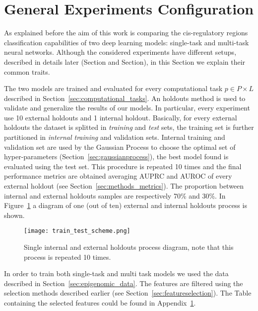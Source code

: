 \section{General Experiments Configuration}
As explained before the aim of this work is comparing the  cis-regulatory regions classification capabilities of two deep learning models: single-task and multi-task neural networks. Although the considered experiments have different setups, described in details later (Section and Section), in this Section we explain their common traits. 

The two models are trained and evaluated for every computational task $p \in P \times L$ described in Section~\ref{sec:computational_tasks}. 
An holdouts method is used to validate and generalize the results of our
models. In particular, every experiment use 10 external holdouts and 1 internal
holdout. Basically, for every external
holdouts the dataset is splitted in \emph{training} and \emph{test} sets, the
training set is further partitioned in \emph{internal training} and validation
sets. Internal training and validation set are used by the Gaussian Process to
choose the optimal set of hyper-parameters (Section~\ref{sec:gaussianprocess}),
the best model found is evaluated using the test set. This procedure is
repeated 10 times and the final performance metrics are obtained averaging AUPRC
and AUROC of every external holdout (see Section~\ref{sec:methods_metrics}). The proportion between internal and external holdouts samples are respectively 70\% and 30\%. In Figure~\ref{fig:train_test_diagram} a diagram of one (out of ten) external and internal holdouts process is shown. 
\begin{figure}[ht]
\centering
\texttt{[image: train\_test\_scheme.png]}
\caption{Single internal and external holdouts process diagram, note that this
process is repeated 10 times.} 
\label{fig:train_test_diagram}
\end{figure}
In order to train both single-task and multi task models we used the data described in Section~\ref{sec:epigenomic_data}. The features are filtered using the selection methods described earlier (see Section~\ref{sec:featureselection}). The Table containing the selected features could be found in Appendix~\ref{}.

